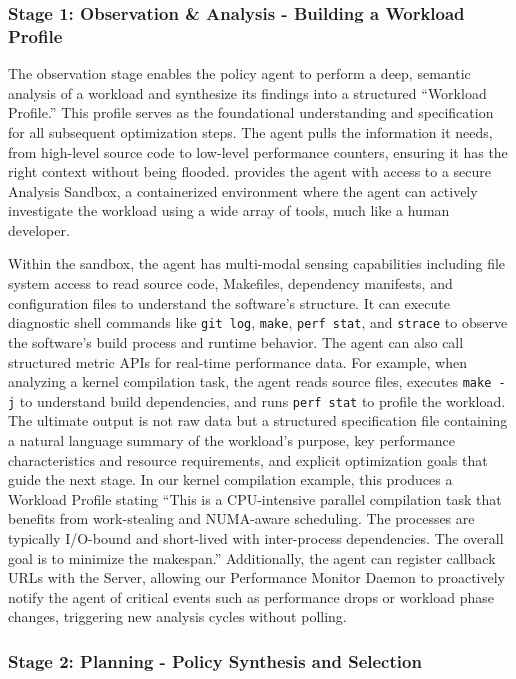\subsubsection{Stage 1: Observation \& Analysis - Building a Workload Profile}

The observation stage enables the policy agent to perform a deep, semantic analysis of a workload and synthesize its findings into a structured ``Workload Profile.'' This profile serves as the foundational understanding and specification for all subsequent optimization steps. The agent pulls the information it needs, from high-level source code to low-level performance counters, ensuring it has the right context without being flooded. \sys provides the agent with access to a secure Analysis Sandbox, a containerized environment where the agent can actively investigate the workload using a wide array of tools, much like a human developer.

Within the sandbox, the agent has multi-modal sensing capabilities including file system access to read source code, Makefiles, dependency manifests, and configuration files to understand the software's structure. It can execute diagnostic shell commands like \texttt{git log}, \texttt{make}, \texttt{perf stat}, and \texttt{strace} to observe the software's build process and runtime behavior. The agent can also call structured metric APIs for real-time performance data. For example, when analyzing a kernel compilation task, the agent reads source files, executes \texttt{make -j} to understand build dependencies, and runs \texttt{perf stat} to profile the workload. The ultimate output is not raw data but a structured specification file containing a natural language summary of the workload's purpose, key performance characteristics and resource requirements, and explicit optimization goals that guide the next stage. In our kernel compilation example, this produces a Workload Profile stating ``This is a CPU-intensive parallel compilation task that benefits from work-stealing and NUMA-aware scheduling. The processes are typically I/O-bound and short-lived with inter-process dependencies. The overall goal is to minimize the makespan.'' Additionally, the agent can register callback URLs with the \sys Server, allowing our Performance Monitor Daemon to proactively notify the agent of critical events such as performance drops or workload phase changes, triggering new analysis cycles without polling.

\subsubsection{Stage 2: Planning - Policy Synthesis and Selection}

